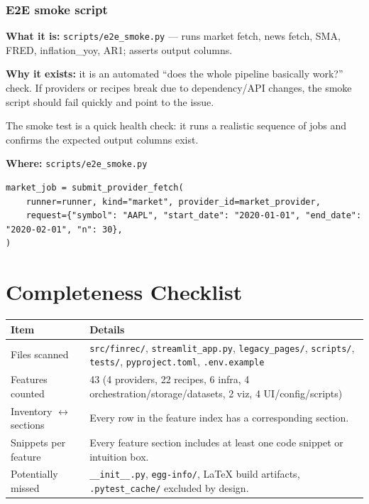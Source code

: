 \documentclass[11pt,a4paper]{article}
\begin{document}
\subsubsection{E2E smoke script}\label{sec:e2e}

\textbf{What it is:} \texttt{scripts/e2e\_smoke.py} --- runs market fetch, news fetch, SMA, FRED, inflation\_yoy, AR1; asserts output columns.

\textbf{Why it exists:} it is an automated ``does the whole pipeline basically work?'' check. If providers or recipes break due to dependency/API changes, the smoke script should fail quickly and point to the issue.

\begin{intuitionbox}
The smoke test is a quick health check: it runs a realistic sequence of jobs and confirms the expected output columns exist.
\end{intuitionbox}

\textbf{Where:} \texttt{scripts/e2e\_smoke.py}

\begin{lstlisting}
market_job = submit_provider_fetch(
    runner=runner, kind="market", provider_id=market_provider,
    request={"symbol": "AAPL", "start_date": "2020-01-01", "end_date": "2020-02-01", "n": 30},
)
\end{lstlisting}

\section{Completeness Checklist}

\begin{tabular}{@{}lp{10cm}@{}}
  \toprule
  \textbf{Item} & \textbf{Details} \\
  \midrule
  Files scanned & \texttt{src/finrec/}, \texttt{streamlit\_app.py}, \texttt{legacy\_pages/}, \texttt{scripts/}, \texttt{tests/}, \texttt{pyproject.toml}, \texttt{.env.example} \\
  Features counted & 43 (4 providers, 22 recipes, 6 infra, 4 orchestration/storage/datasets, 2 viz, 4 UI/config/scripts) \\
  Inventory $\leftrightarrow$ sections & Every row in the feature index has a corresponding section. \\
  Snippets per feature & Every feature section includes at least one code snippet or intuition box. \\
  Potentially missed & \texttt{\_\_init\_\_.py}, \texttt{egg-info/}, LaTeX build artifacts, \texttt{.pytest\_cache/} excluded by design. \\
  \bottomrule
\end{tabular}
\end{document}
